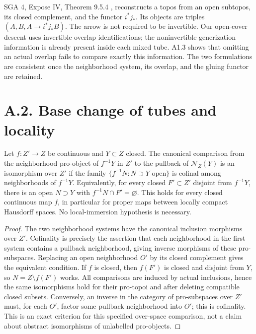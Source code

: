 SGA 4, Expose IV, Theorem 9.5.4 \cite{SGA4}, reconstructs a topos from an
open subtopos, its closed complement, and the functor $i^*j_*$. Its objects
are triples $(A,B,A\to i^*j_*B)$. The arrow is not required to be invertible.
Our open-cover descent uses invertible overlap identifications; the
noninvertible generization information is already present inside each
mixed tube. A1.3 shows that omitting an actual overlap fails to compare
exactly this information. The two formulations are consistent once the
neighborhood system, its overlap, and the gluing functor are retained.

\section{A.2. Base change of tubes and locality}
\begin{result}\label{A2.1}
Let $f:Z'\to Z$ be continuous and $Y\subset Z$ closed. The canonical
comparison from the neighborhood pro-object of $f^{-1}Y$ in $Z'$ to the
pullback of $\mathcal N_Z(Y)$ is an isomorphism over $Z'$ if the family
$\{f^{-1}N:N\supset Y\text{ open}\}$ is cofinal among neighborhoods of
$f^{-1}Y$. Equivalently, for every closed $F'\subset Z'$ disjoint from
$f^{-1}Y$, there is an open $N\supset Y$ with $f^{-1}N\cap F'=\varnothing$.
This holds for every closed continuous map $f$, in particular for proper
maps between locally compact Hausdorff spaces. No local-immersion
hypothesis is necessary.
\end{result}
\begin{proof}
The two neighborhood systems have the canonical inclusion morphisms over
$Z'$. Cofinality is precisely the assertion that each neighborhood in the
first system contains a pullback neighborhood, giving inverse morphisms
of these pro-subspaces. Replacing an open neighborhood $O'$ by its closed
complement gives the equivalent condition. If $f$ is closed, then
$f(F')$ is closed and disjoint from $Y$, so $N=Z\setminus f(F')$ works.
All comparisons are induced by actual inclusions, hence the same
isomorphisms hold for their pro-topoi and after deleting compatible
closed subsets. Conversely, an inverse in the category of pro-subspaces
over $Z'$ must, for each $O'$, factor some pullback neighborhood into
$O'$; this is cofinality. This is an exact criterion for this specified
over-space comparison, not a claim about abstract isomorphisms of
unlabelled pro-objects.
\end{proof}

